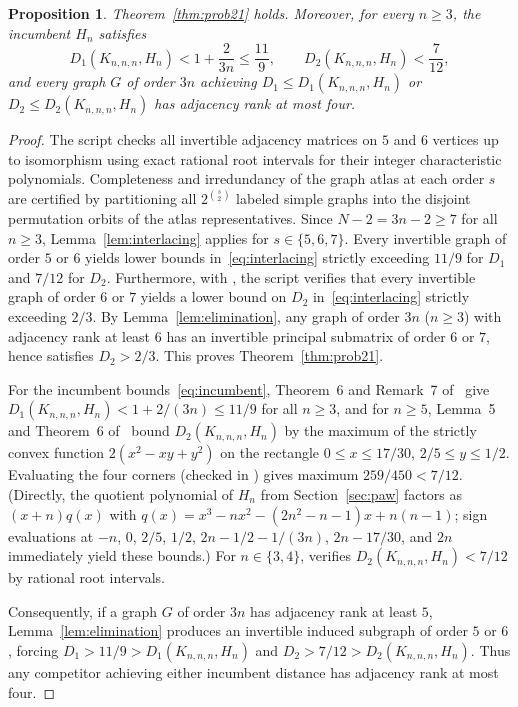 \documentclass[10pt]{article}
\newtheorem{proposition}[theorem]{Proposition}
\begin{document}
\begin{proposition}\label{prop:rank-reduction}
Theorem~\ref{thm:prob21} holds. Moreover, for every $n \geq 3$, the incumbent $H_n$ satisfies
\begin{equation}\label{eq:incumbent}
D_1(K_{n,n,n}, H_n) < 1 + \frac{2}{3n} \leq \frac{11}{9}, \qquad
D_2(K_{n,n,n}, H_n) < \frac{7}{12},
\end{equation}
and every graph $G$ of order $3n$ achieving $D_1 \leq D_1(K_{n,n,n}, H_n)$ or $D_2 \leq D_2(K_{n,n,n}, H_n)$ has adjacency rank at most four.
\end{proposition}

\begin{proof}
The script \texttt{} checks all invertible adjacency matrices on $5$ and $6$ vertices up to isomorphism using exact rational root intervals for their integer characteristic polynomials. Completeness and irredundancy of the graph atlas at each order $s$ are certified by partitioning all $2^{\binom{s}{2}}$ labeled simple graphs into the disjoint permutation orbits of the atlas representatives. Since $N - 2 = 3n - 2 \geq 7$ for all $n \geq 3$, Lemma~\ref{lem:interlacing} applies for $s \in \{5, 6, 7\}$. Every invertible graph of order $5$ or $6$ yields lower bounds in~\eqref{eq:interlacing} strictly exceeding $11/9$ for $D_1$ and $7/12$ for $D_2$. Furthermore, with \texttt{}, the script verifies that every invertible graph of order $6$ or $7$ yields a lower bound on $D_2$ in~\eqref{eq:interlacing} strictly exceeding $2/3$. By Lemma~\ref{lem:elimination}, any graph of order $3n$ ($n \geq 3$) with adjacency rank at least $6$ has an invertible principal submatrix of order $6$ or $7$, hence satisfies $D_2 > 2/3$. This proves Theorem~\ref{thm:prob21}.

For the incumbent bounds~\eqref{eq:incumbent}, Theorem~6 and Remark~7 of~\cite{JSS2026} give $D_1(K_{n,n,n}, H_n) < 1 + 2/(3n) \leq 11/9$ for all $n \geq 3$, and for $n \geq 5$, Lemma~5 and Theorem~6 of~\cite{JSS2026} bound $D_2(K_{n,n,n}, H_n)$ by the maximum of the strictly convex function $2(x^2 - xy + y^2)$ on the rectangle $0 \leq x \leq 17/30$, $2/5 \leq y \leq 1/2$. Evaluating the four corners (checked in \texttt{}) gives maximum $259/450 < 7/12$. (Directly, the quotient polynomial of $H_n$ from Section~\ref{sec:paw} factors as $(x+n)q(x)$ with $q(x) = x^3 - nx^2 - (2n^2-n-1)x + n(n-1)$; sign evaluations at $-n$, $0$, $2/5$, $1/2$, $2n - 1/2 - 1/(3n)$, $2n - 17/30$, and $2n$ immediately yield these bounds.) For $n \in \{3, 4\}$, \texttt{} verifies $D_2(K_{n,n,n}, H_n) < 7/12$ by rational root intervals.

Consequently, if a graph $G$ of order $3n$ has adjacency rank at least $5$, Lemma~\ref{lem:elimination} produces an invertible induced subgraph of order $5$ or $6$, forcing $D_1 > 11/9 > D_1(K_{n,n,n}, H_n)$ and $D_2 > 7/12 > D_2(K_{n,n,n}, H_n)$. Thus any competitor achieving either incumbent distance has adjacency rank at most four.
\end{proof}
\end{document}
